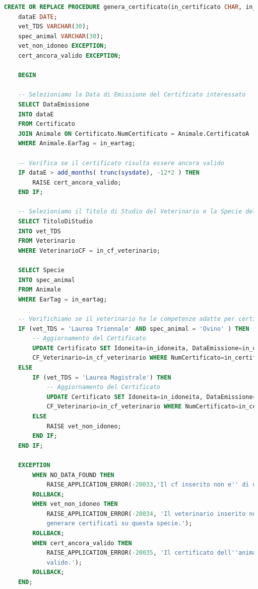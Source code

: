 \documentclass[12pt]{report}
\begin{document}
\begin{lstlisting}[language=SQL,caption={RINNOVO\_CERTIFICATO}]
    CREATE OR REPLACE PROCEDURE genera_certificato(in_certificato CHAR, in_idoneita CHAR, in_data_emissione DATE ,in_cf_veterinario CHAR, in_eartag CHAR) IS 
    dataE DATE;
    vet_TDS VARCHAR(30);
    spec_animal VARCHAR(30);
    vet_non_idoneo EXCEPTION;
    cert_ancora_valido EXCEPTION;
    
    BEGIN
    
    -- Selezioniamo la Data di Emissione del Certificato interessato
    SELECT DataEmissione
    INTO dataE
    FROM Certificato
    JOIN Animale ON Certificato.NumCertificato = Animale.CertificatoA
    WHERE Animale.EarTag = in_eartag;
    
    -- Verifica se il certificato risulta essere ancora valido
    IF dataE > add_months( trunc(sysdate), -12*2 ) THEN
        RAISE cert_ancora_valido;
    END IF;
    
    -- Selezioniamo il Titolo di Studio del Veterinario e la Specie dell'animale da certificare
    SELECT TitoloDiStudio
    INTO vet_TDS
    FROM Veterinario
    WHERE VeterinarioCF = in_cf_veterinario;
    
    SELECT Specie
    INTO spec_animal
    FROM Animale
    WHERE EarTag = in_eartag;
    
    -- Verifichiamo se il veterinario ha le competenze adatte per certificare l'animale
    IF (vet_TDS = 'Laurea Triennale' AND spec_animal = 'Ovino' ) THEN
        -- Aggiornamento del Certificato
        UPDATE Certificato SET Idoneita=in_idoneita, DataEmissione=in_data_emissione, 
        CF_Veterinario=in_cf_veterinario WHERE NumCertificato=in_certificato;
    ELSE
        IF (vet_TDS = 'Laurea Magistrale') THEN
            -- Aggiornamento del Certificato
            UPDATE Certificato SET Idoneita=in_idoneita, DataEmissione=in_data_emissione, 
            CF_Veterinario=in_cf_veterinario WHERE NumCertificato=in_certificato;
        ELSE
            RAISE vet_non_idoneo;
        END IF;	
    END IF;
	
	EXCEPTION
	    WHEN NO_DATA_FOUND THEN
	        RAISE_APPLICATION_ERROR(-20033,'Il cf inserito non e'' di un veterinario.');
	    ROLLBACK;
	    WHEN vet_non_idoneo THEN
	        RAISE_APPLICATION_ERROR(-20034, 'Il veterinario inserito non e'' abilitato a 
	        generare certificati su questa specie.');
	    ROLLBACK;
	    WHEN cert_ancora_valido THEN
	        RAISE_APPLICATION_ERROR(-20035, 'Il certificato dell''animale risulta ancora 
	        valido.');
	    ROLLBACK;
    END;
\end{lstlisting}
\end{document}
